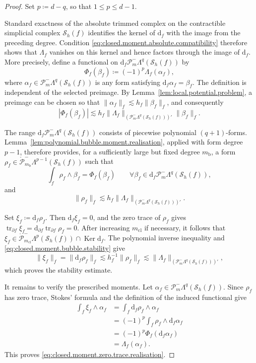 \documentclass[a4paper,11pt]{article}
\theoremstyle{definition}
\newcommand{\DIFF}{\mathrm{d}}
\newcommand{\Sh}{\mathcal{S}_h}
\newcommand{\PLtrim}[2]{\mathcal{P}_{#1}^{-}\Lambda^{#2}}
\newcommand{\trc}{\operatorname{tr}}
\newcommand{\Ker}{\operatorname{Ker}}
\newcommand{\PLtrimz}[2]{\mathring{\mathcal P}_{#1}^{-}\Lambda^{#2}}
\begin{document}
\begin{proof}
Set $p\coloneqq d-q$, so that $1\leq p\leq d-1$.

Standard exactness of the absolute trimmed complex on the contractible simplicial complex $\Sh(f)$ \cite{Arnold.Falk.ea:06,Arnold.Falk.ea:09} identifies the kernel of $\DIFF_f$ with the image from the preceding degree.
Condition \eqref{eq:closed.moment.absolute.compatibility} therefore shows that $\Lambda_f$ vanishes on this kernel and hence factors through the image of $\DIFF_f$.
More precisely, define a functional on $\DIFF_f\PLtrim{m}{q}(\Sh(f))$ by
\[
\Phi_f(\beta_f)
\coloneqq
(-1)^p\Lambda_f(\alpha_f),
\]
where $\alpha_f\in\PLtrim{m}{q}(\Sh(f))$ is any form satisfying $\DIFF_f\alpha_f=\beta_f$.
The definition is independent of the selected preimage.
By Lemma~\ref{lem:local.potential.problem}, a preimage can be chosen so that $\|\alpha_f\|_f\lesssim h_f\|\beta_f\|_f$, and consequently
\[
|\Phi_f(\beta_f)|
\lesssim
h_f
\|\Lambda_f\|_{
\left(
\PLtrim{m}{q}(\Sh(f))
\right)'
}
\|\beta_f\|_f.
\]

The range $\DIFF_f\PLtrim{m}{q}(\Sh(f))$ consists of piecewise polynomial $(q+1)$-forms.
Lemma~\ref{lem:polynomial.bubble.moment.realisation}, applied with form degree $p-1$, therefore provides, for a sufficiently large but fixed degree $m_{\mathrm b}$, a form $\rho_f\in\PLtrimz{m_{\mathrm b}}{p-1}(\Sh(f))$ such that
\[
\int_f\rho_f\wedge\beta_f
=
\Phi_f(\beta_f)
\qquad
\forall
\beta_f\in
\DIFF_f\PLtrim{m}{q}(\Sh(f)),
\]
and
\begin{equation}\label{eq:closed.moment.bubble.stability}
\|\rho_f\|_f
\lesssim
h_f
\|\Lambda_f\|_{
\left(
\PLtrim{m}{q}(\Sh(f))
\right)'
}.
\end{equation}

Set $\xi_f\coloneqq\DIFF_f\rho_f$.
Then $\DIFF_f\xi_f=0$, and the zero trace of $\rho_f$ gives $\trc_{\partial f}\xi_f = \DIFF_{\partial f}\trc_{\partial f}\rho_f = 0$.
After increasing $m_{\mathrm{cl}}$ if necessary, it follows that $\xi_f \in \PLtrimz{m_{\mathrm{cl}}}{p}(\Sh(f)) \cap \Ker\DIFF_f$.
The polynomial inverse inequality and \eqref{eq:closed.moment.bubble.stability} give
\[
  \|\xi_f\|_f
  =
  \|\DIFF_f\rho_f\|_f
  \lesssim
  h_f^{-1}\|\rho_f\|_f
  \lesssim
  \|\Lambda_f\|_{
    \left(
      \PLtrim{m}{q}(\Sh(f))
    \right)'
  },
\]
which proves the stability estimate.

It remains to verify the prescribed moments.
Let $\alpha_f\in\PLtrim{m}{q}(\Sh(f))$.
Since $\rho_f$ has zero trace, Stokes' formula and the definition of the induced functional give
\[
\begin{aligned}
  \int_f\xi_f\wedge\alpha_f
  &=
  \int_f\DIFF_f\rho_f\wedge\alpha_f
  \\
  &=
  (-1)^p
  \int_f\rho_f\wedge\DIFF_f\alpha_f
  \\
  &=
  (-1)^p
  \Phi_f\left(\DIFF_f\alpha_f\right)
  \\
  &=
  \Lambda_f(\alpha_f).
\end{aligned}
\]
This proves \eqref{eq:closed.moment.zero.trace.realisation}.


\end{proof}
\end{document}
